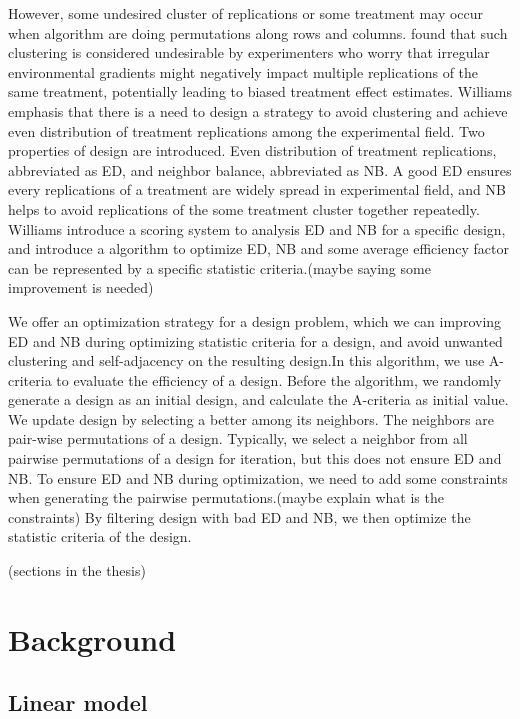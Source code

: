 \documentclass[
  a4paper,
  oneside,
  openany,
  12pt,
  onecolumn]{book}
\theoremstyle{plain}
\theoremstyle{definition}
\theoremstyle{remark}
\begin{document}
However, some undesired cluster of replications or some treatment may
occur when algorithm are doing permutations along rows and columns.
\citet{piepho2018neighbor} found that such clustering is considered
undesirable by experimenters who worry that irregular environmental
gradients might negatively impact multiple replications of the same
treatment, potentially leading to biased treatment effect estimates.
Williams emphasis that there is a need to design a strategy to avoid
clustering and achieve even distribution of treatment replications among
the experimental field. Two properties of design are introduced. Even
distribution of treatment replications, abbreviated as ED, and neighbor
balance, abbreviated as NB. A good ED ensures every replications of a
treatment are widely spread in experimental field, and NB helps to avoid
replications of the some treatment cluster together repeatedly. Williams
introduce a scoring system to analysis ED and NB for a specific design,
and introduce a algorithm to optimize ED, NB and some average efficiency
factor can be represented by a specific statistic criteria.(maybe saying
some improvement is needed)

We offer an optimization strategy for a design problem, which we can
improving ED and NB during optimizing statistic criteria for a design,
and avoid unwanted clustering and self-adjacency on the resulting
design.In this algorithm, we use A-criteria to evaluate the efficiency
of a design. Before the algorithm, we randomly generate a design as an
initial design, and calculate the A-criteria as initial value. We update
design by selecting a better among its neighbors. The neighbors are
pair-wise permutations of a design. Typically, we select a neighbor from
all pairwise permutations of a design for iteration, but this does not
ensure ED and NB. To ensure ED and NB during optimization, we need to
add some constraints when generating the pairwise permutations.(maybe
explain what is the constraints) By filtering design with bad ED and NB,
we then optimize the statistic criteria of the design.

(sections in the thesis)


\chapter{Background}\label{sec-bg}

\section{Linear model}\label{linear-model}
\end{document}
